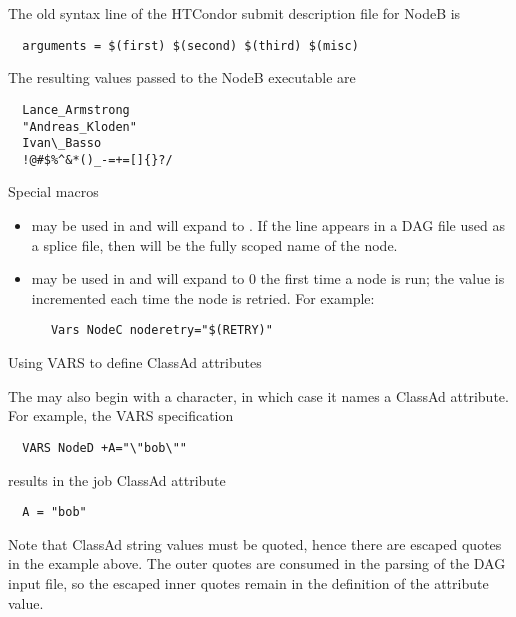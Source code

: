 The old syntax  line of the HTCondor submit description file
for NodeB is
\footnotesize
\begin{verbatim}
  arguments = $(first) $(second) $(third) $(misc)
\end{verbatim}
\normalsize

The resulting values passed to the NodeB executable are
\footnotesize
\begin{verbatim}
  Lance_Armstrong
  "Andreas_Kloden"
  Ivan\_Basso
  !@#$%^&*()_-=+=[]{}?/
\end{verbatim}
\normalsize

\begin{description}
\item[Special macros]
\end{description}

\begin{itemize}
\item {} may be used in  and will expand to
. 
If the  line appears in a DAG file used as a splice file, 
then  will be the fully scoped name of the node.
\item {} may be used in  and will expand to
0 the first time a node is run; the value is incremented each time the node
is retried.  For example:
\end{itemize}
\begin{verbatim}
      Vars NodeC noderetry="$(RETRY)"
\end{verbatim}

\begin{description}
\item[Using VARS to define ClassAd attributes]
\end{description}

The  may also begin with a \Expr{+} character, in which case it
names a ClassAd attribute. For example, the VARS specification
\begin{verbatim}
  VARS NodeD +A="\"bob\""
\end{verbatim}
results in the job ClassAd attribute
\begin{verbatim}
  A = "bob"
\end{verbatim}
Note that ClassAd string values must be quoted, hence there are escaped
quotes in the example above.  The outer quotes are consumed in the parsing of
the DAG input file, so the escaped inner quotes remain in the definition
of the attribute value.

